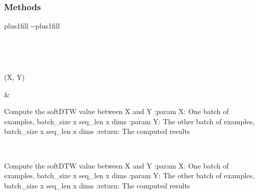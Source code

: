 \documentclass[letterpaper,10pt,english]{sphinxmanual}
\begin{document}
\begin{fulllineitems}
\subsubsection*{Methods}


\begin{savenotes}
\sphinxatlongtablestart
\sphinxthistablewithglobalstyle
\sphinxthistablewithnovlinesstyle
\makeatletter
  \LTleft \@totalleftmargin plus1fill
  \LTright\dimexpr\columnwidth-\@totalleftmargin-\linewidth\relax plus1fill
\makeatother
\begin{longtable}{}
\sphinxtoprule
\endfirsthead

\\
\sphinxtoprule
\endhead

\sphinxbottomrule
{}\\
\endfoot

\endlastfoot
\sphinxtableatstartofbodyhook
\begin{varwidth}[t]{}
\sphinxAtStartPar
{\hyperref[\detokenize{dtw_loss_functions.soft_dtw_implementations.soft_dtw_cuda_mag:dtw_loss_functions.soft_dtw_implementations.soft_dtw_cuda_mag.SoftDTW.forward}]{}}(X, Y)
\sphinxbeforeendvarwidth
\end{varwidth}%
&\begin{varwidth}[t]{}
\sphinxAtStartPar
Compute the soft\sphinxhyphen{}DTW value between X and Y :param X: One batch of examples, batch\_size x seq\_len x dims :param Y: The other batch of examples, batch\_size x seq\_len x dims :return: The computed results
\sphinxbeforeendvarwidth
\end{varwidth}%
\\
\sphinxbottomrule
\end{longtable}
\sphinxtableafterendhook
\sphinxatlongtableend
\end{savenotes}

\begin{fulllineitems}
\label{\detokenize{dtw_loss_functions.soft_dtw_implementations.soft_dtw_cuda_mag:dtw_loss_functions.soft_dtw_implementations.soft_dtw_cuda_mag.SoftDTW.forward}}
\pysigstartsignatures
\pysiglinewithargsret
{}
{\sphinxparamcomma {}}
{}
\pysigstopsignatures
\sphinxAtStartPar
Compute the soft\sphinxhyphen{}DTW value between X and Y
:param X: One batch of examples, batch\_size x seq\_len x dims
:param Y: The other batch of examples, batch\_size x seq\_len x dims
:return: The computed results

\end{fulllineitems}


\end{fulllineitems}
\end{document}
